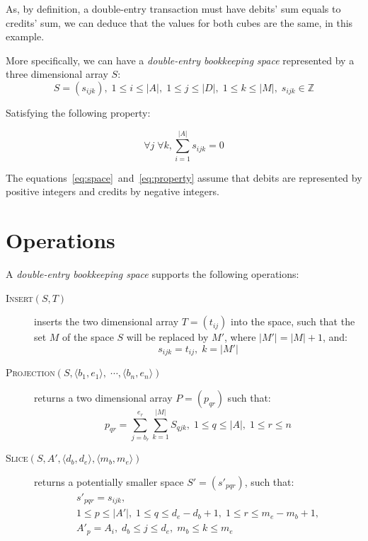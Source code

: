 \documentclass{article}
\begin{document}
As, by definition, a double-entry transaction must have debits' sum
equals to credits' sum, we can deduce that the values for both
cubes are the same, in this example.

More specifically, we can have a \emph{double-entry bookkeeping space} 
represented by a three dimensional array $S$:
\begin{equation}
	\label{eq:space}
	S = \left(s_{ijk}\right), 
	\; 1 \leq i \leq |A|, \; 1 \leq j \leq |D|, \; 1 \leq k \leq |M|, 
	\; s_{ijk} \in \mathbb{Z}
\end{equation}

Satisfying the following property:

\begin{equation}
	\label{eq:property}
	\forall j \; \forall k, \sum_{i=1}^{|A|}{s_{ijk}} = 0
\end{equation}

The equations~\eqref{eq:space}~and~\eqref{eq:property}
assume that debits are represented by positive integers
and credits by negative integers.

\section{Operations}

A \emph{double-entry bookkeeping space} supports the following operations:

\begin{description}
	\item[\textsc{Insert}$(S,T)$] inserts the two dimensional array 
	$T=\left(t_{ij}\right)$ into the space,
		such that the set $M$ of the space $S$ will be replaced by $M'$, 
		where $|M'| = |M|+1$, and:
		\[
			s_{ijk} = t_{ij}, \; k = |M'|
		\]

	\item[\textsc{Projection}$(S, \langle b_1, e_1 \rangle, \; \cdots,
		\langle b_n, e_n \rangle)$] 
		returns a two dimensional array $P=\left(p_{qr}\right)$ such that:
		\[
			p_{qr} = \sum_{j=b_r}^{e_r}{\sum_{k=1}^{|M|}{S_{qjk}}}, 
				\; 1 \leq q \leq |A|, \; 1 \leq r \leq n
		\]

	\item[\textsc{Slice}$(S, A', \langle d_b,d_e \rangle, \langle m_b,m_e \rangle)$] 
		returns a potentially smaller space $S'=\left(s'_{pqr}\right)$, such that:
		\[
			\begin{array}{l}
				s'_{pqr} = s_{ijk}, \\
				1 \leq p \leq |A'|, \;1 \leq q \leq d_e-d_b+1, \; 1 \leq r \leq m_e-m_b+1, \\
				A'_p = A_i, \; d_b \leq j \leq d_e, \; m_b \leq k \leq m_e
			\end{array}			
		\]

\end{description}
\end{document}
